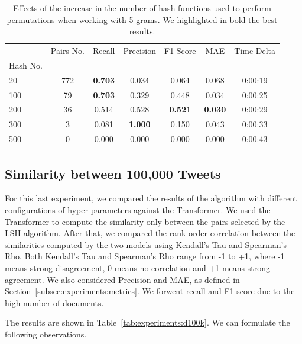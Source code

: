 \documentclass[runningheads]{llncs}
\begin{document}
\begin{table}
  \caption{Effects of the increase in the number of hash functions used to perform permutations when working with 5-grams. We highlighted in bold the best results.}
  \label{tab:experiments:hashes_k5}
  \centering
  \begin{tabular}{lcccccc}
    \toprule
    {} &  Pairs No. &  Recall &  Precision &  F1-Score &    MAE & Time Delta \\
    Hash No. &            &         &            &           &        &            \\
    \midrule
    20       &        772 &   \textbf{0.703} &      0.034 &     0.064 &  0.068 &    0:00:19 \\
    100      &         79 &   \textbf{0.703} &      0.329 &     0.448 &  0.034 &    0:00:25 \\
    200      &         36 &   0.514 &      0.528 &     \textbf{0.521} &  \textbf{0.030} &    0:00:29 \\
    300      &          3 &   0.081 &      \textbf{1.000} &     0.150 &  0.043 &    0:00:33 \\
    500      &          0 &   0.000 &      0.000 &     0.000 &  0.000 &    0:00:43 \\
    \bottomrule
    \end{tabular}
\end{table}

\subsection{Similarity between 100,000 Tweets}
\label{subsec:experiments:100k}

For this last experiment, we compared the results of the algorithm with different configurations of hyper-parameters against the Transformer. We used the Transformer to compute the similarity only between the pairs selected by the LSH algorithm. After that, we compared the rank-order correlation between the similarities computed by the two models using Kendall's Tau and Spearman's Rho. Both Kendall's Tau and Spearman's Rho range from -1 to +1, where -1 means strong disagreement, 0 means no correlation and +1 means strong agreement. We also considered Precision and MAE, as defined in Section~\ref{subsec:experiments:metrics}. We forwent recall and F1-score due to the high number of documents.

The results are shown in Table~\ref{tab:experiments:d100k}. We can formulate the following observations.
\end{document}
